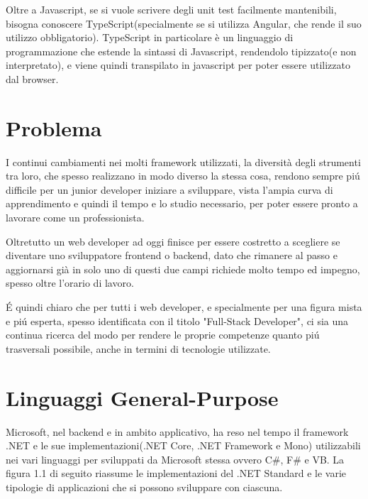 Oltre a Javascript, se si vuole scrivere degli unit test facilmente mantenibili, bisogna conoscere TypeScript(specialmente se si utilizza Angular, che rende il suo utilizzo obbligatorio).
TypeScript in particolare \`e un linguaggio di programmazione che estende la sintassi di Javascript, rendendolo tipizzato(e non interpretato), e viene quindi transpilato in javascript per poter essere utilizzato dal browser.

\section{Problema}\label{sez:problema}
I continui cambiamenti nei molti framework utilizzati, la diversit\`a degli strumenti tra loro, che spesso realizzano in modo diverso la stessa cosa, rendono sempre pi\'u difficile per un junior developer iniziare a sviluppare, vista l'ampia curva di apprendimento e quindi il tempo e lo studio necessario, per poter essere pronto a lavorare come un professionista.

Oltretutto un web developer ad oggi finisce per essere costretto a scegliere se diventare uno sviluppatore frontend o backend, dato che rimanere al passo e aggiornarsi gi\`a in solo uno di questi due campi richiede molto tempo ed impegno, spesso oltre l'orario di lavoro.

\'E quindi chiaro che per tutti i web developer, e specialmente per una figura mista e pi\'u esperta, spesso identificata con il titolo "Full-Stack Developer", ci sia una continua ricerca del modo per rendere le proprie competenze quanto pi\'u trasversali possibile, anche in termini di tecnologie utilizzate.

\pagebreak

\section{Linguaggi General-Purpose}\label{sez:problema}
Microsoft, nel backend e in ambito applicativo, ha reso nel tempo il framework .NET e le sue implementazioni(.NET Core, .NET Framework e Mono) utilizzabili nei vari linguaggi per sviluppati da Microsoft stessa ovvero C\#, F\# e VB.
La figura 1.1 di seguito riassume le implementazioni del .NET Standard e le varie tipologie di applicazioni che si possono sviluppare con ciascuna.

